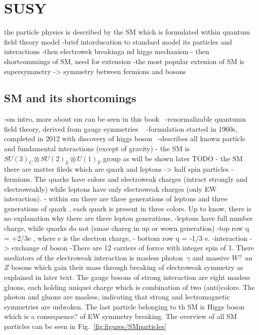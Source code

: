 \chapter{SUSY}

the particle physics is described by the SM which is formulated within quantum field theory model
-brief intorducation to standard model its particles and interactions
-then electrowek breakinga nd higgs mechanism
- then shortcommings of SM, need for extension
-the most popular extenion of SM is supersymmetry -> symmetry between fermions and bosons

\section{SM and its shortcomings}


-sm intro, more about sm can be seen in this book~\cite{9783527406012} %
-renormalizable quantumn field theory, derived from gauge symmetries ~\cite{tHooft:1971qjg, Weinberg:1967tq}
-formulation started in 1960s, completed in 2012 with discovery of higgs boson~\cite{Chatrchyan:2012xdj, Aad:2012tfa}
-describes all known particle and fundamental interactions (except of gravity)  
- the SM is $SU(3)_{C} \otimes SU(2)_{L} \otimes U(1)_{Y} $ group as will be shown later TODO
- the SM there are matter fileds which are quark and leptons -> half spin particles - fermions. The quarks have colors and electroweak charges (intract strongly and electroweakly) while leptons have only electroweak charges (only EW interaction).
- within sm there are three generations of leptons and three generations of quark , each quark is present in three colors. Up to know, there is no explanation why there are three lepton generations.
-leptons have full number charge, while quarks do not (smae chareg in up or wown generation)
-top row q = +2/3e , where e is the electron charge, 
- bottom row q = -1/3 e.
-interaction -> exchange of boson
-There are 12 carriers of forrce with integer spin of 1. There mediators of the electroweak interaction is masless photon~$\gamma$ and massive $W^{\pm}$ an $Z$ bosons which gain their mass through breaking of electroweak symmetry as explained in later text.  The gauge bosons of strong interaction are eight masless gluons, each holding uniquei charge which is combination of two (anti)colors. The photon and  gluons are masless, indicating that strong and lectromagnetic symmetries are unbroken. The last particle belonging to th SM is Higgs boson which is a consequence? of EW symmetry breaking. The overview of all SM particles can be seen in Fig.~\ref{fig:figures/SMparticles}

